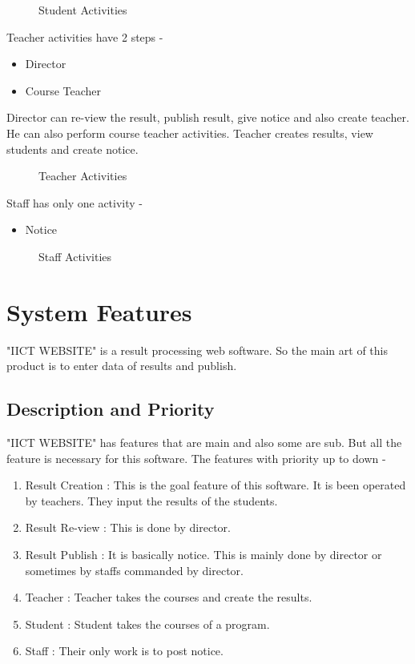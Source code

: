 \documentclass{scrreprt}
\begin{document}
\begin{figure}[h!]
    \centering
    \caption{Student Activities}
    \label{fig:Students Activites}
\end{figure}
\newpage
Teacher activities have 2 steps - 
\begin{itemize}
    \item Director
    \item Course Teacher
\end{itemize}
Director can re-view the result, publish result, give notice and also create teacher. He can also perform course teacher activities.
\newline
Teacher creates results, view students and create notice.
\newline
\begin{figure}[h!]
    \centering
    \caption{Teacher Activities}
    \label{fig:Teacher Activities}
\end{figure}
\newline
Staff has only one activity - 
\begin{itemize}
    \item Notice
\end{itemize} 
\begin{figure}[h!]
    \centering

    \caption{Staff Activities}
    \label{fig:Staff Activities}
\end{figure}

\chapter{System Features}
"IICT WEBSITE" is a result processing web software. So the main art of this product is to enter data of results and publish. 

\section{Description and Priority}
"IICT WEBSITE" has features that are main and also some are sub. But all the feature is necessary for this software.
\newline
The features with priority up to down - 
\begin{enumerate}
    \item Result Creation : This is the goal feature of this software. It is been operated by teachers. They input the results of the students.
    \item Result Re-view : This is done by director.
    \item Result Publish : It is basically notice. This is mainly done by director or sometimes by staffs commanded by director.
    \item Teacher : Teacher takes the courses and create the results.
    \item Student : Student takes the courses of a program.
    \item Staff : Their only work is to post notice.
\end{enumerate}
\end{document}
